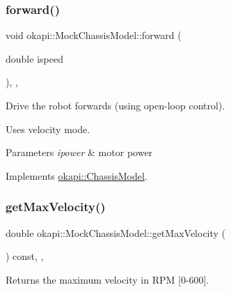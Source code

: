 \mbox{\label{classokapi_1_1MockChassisModel_abfc507d3172ba7b6e5d55bcf547fb07f}} 
\subsubsection{\texorpdfstring{forward()}{forward()}}
{\footnotesize\ttfamily void okapi\+::\+Mock\+Chassis\+Model\+::forward (\begin{DoxyParamCaption}\item[{double}]{ispeed }\end{DoxyParamCaption})\hspace{0.3cm}{\ttfamily [inline]}, {\ttfamily [override]}, {\ttfamily [virtual]}}



Drive the robot forwards (using open-\/loop control). 

Uses velocity mode.


\begin{DoxyParams}{Parameters}
{\em ipower} & motor power \\
\hline
\end{DoxyParams}


Implements \mbox{\hyperlink{classokapi_1_1ChassisModel_ae39e8ccd15b6f84e32cd21fe99bdd6c9}{okapi\+::\+Chassis\+Model}}.

\mbox{\label{classokapi_1_1MockChassisModel_a01cc886c9187f9b9344933c4755811f0}} 
\subsubsection{\texorpdfstring{getMaxVelocity()}{getMaxVelocity()}}
{\footnotesize\ttfamily double okapi\+::\+Mock\+Chassis\+Model\+::get\+Max\+Velocity (\begin{DoxyParamCaption}{ }\end{DoxyParamCaption}) const\hspace{0.3cm}{\ttfamily [inline]}, {\ttfamily [override]}, {\ttfamily [virtual]}}



Returns the maximum velocity in R\+PM \mbox{[}0-\/600\mbox{]}. 

